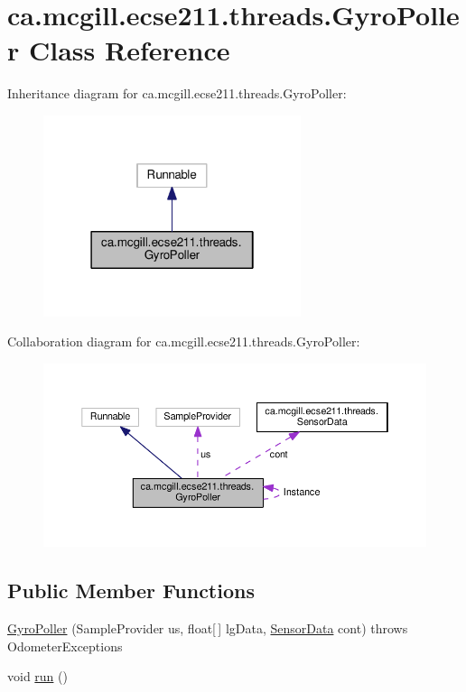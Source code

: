 \hypertarget{classca_1_1mcgill_1_1ecse211_1_1threads_1_1_gyro_poller}{}\section{ca.\+mcgill.\+ecse211.\+threads.\+Gyro\+Poller Class Reference}
\label{classca_1_1mcgill_1_1ecse211_1_1threads_1_1_gyro_poller}


Inheritance diagram for ca.\+mcgill.\+ecse211.\+threads.\+Gyro\+Poller\+:
\nopagebreak
\begin{figure}[H]
\begin{center}
\leavevmode
\includegraphics[width=214pt]{classca_1_1mcgill_1_1ecse211_1_1threads_1_1_gyro_poller__inherit__graph}
\end{center}
\end{figure}


Collaboration diagram for ca.\+mcgill.\+ecse211.\+threads.\+Gyro\+Poller\+:
\nopagebreak
\begin{figure}[H]
\begin{center}
\leavevmode
\includegraphics[width=350pt]{classca_1_1mcgill_1_1ecse211_1_1threads_1_1_gyro_poller__coll__graph}
\end{center}
\end{figure}
\subsection*{Public Member Functions}
\begin{DoxyCompactItemize}
\item 
\hyperlink{classca_1_1mcgill_1_1ecse211_1_1threads_1_1_gyro_poller_a1bab49cc19ee3b633ddbec4c408927bf}{Gyro\+Poller} (Sample\+Provider us, float\mbox{[}$\,$\mbox{]} lg\+Data, \hyperlink{classca_1_1mcgill_1_1ecse211_1_1threads_1_1_sensor_data}{Sensor\+Data} cont)  throws Odometer\+Exceptions 
\item 
void \hyperlink{classca_1_1mcgill_1_1ecse211_1_1threads_1_1_gyro_poller_a7a3232e355cece714fa85a3a902d9cfd}{run} ()
\end{DoxyCompactItemize}
